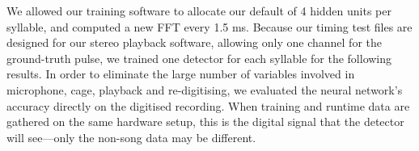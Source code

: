 \documentclass[10pt,letterpaper]{article}
\let\oldmarginpar\marginpar
\renewcommand{\marginpar}[1]{\oldmarginpar{\linespread{1}\scriptsize{#1}}}
\begin{document}
We allowed our training software to allocate our default of 4 hidden
units per syllable, and computed a new FFT every 1.5 ms.  Because our
timing test files are designed for our stereo playback software,
allowing only one channel for the ground-truth pulse, we trained one
detector for each syllable for the following results.  In order to
eliminate the large number of variables involved in microphone, cage,
playback and re-digitising, we evaluated the neural network's accuracy
directly on the digitised recording.  When training and runtime data
are gathered on the same hardware setup, this is the digital signal
that the detector will see---only the non-song data may be different.
\end{document}
